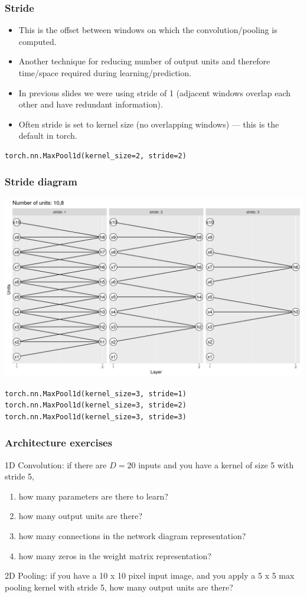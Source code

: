 \documentclass{beamer}
\begin{document}
\begin{frame}[fragile]
  \frametitle{Stride}
  \begin{itemize}
  \item This is the offset between windows on which the
    convolution/pooling is computed.
  \item Another technique for reducing number of output units and
    therefore time/space required during learning/prediction.
  \item In previous slides we were using stride of 1 (adjacent windows
    overlap each other and have redundant information).
  \item Often stride is set to kernel size (no overlapping windows)
    --- this is the default in torch.
  \end{itemize} 
\begin{verbatim}
torch.nn.MaxPool1d(kernel_size=2, stride=2)
\end{verbatim}
\end{frame}

\begin{frame}[fragile]
  \frametitle{Stride diagram}
  \includegraphics[width=\textwidth]{figure-pooling-10-3}
\begin{verbatim}
torch.nn.MaxPool1d(kernel_size=3, stride=1)
torch.nn.MaxPool1d(kernel_size=3, stride=2)
torch.nn.MaxPool1d(kernel_size=3, stride=3)
\end{verbatim}
\end{frame}

\begin{frame}
  \frametitle{Architecture exercises}
  1D Convolution: if there are $D=20$ inputs and you have a kernel of
  size 5 with stride 5,
  \begin{enumerate}
  \item how many parameters are there to learn?
  \item how many output units are there?
  \item how many connections in the network diagram
    representation?
  \item how many zeros in the weight matrix
    representation?
  \end{enumerate}
  2D Pooling: if you have a 10 x 10 pixel input image, and you apply a
  5 x 5 max pooling kernel with stride 5, how many output units are
  there?
\end{frame}
\end{document}
